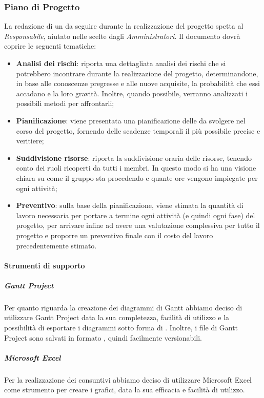 \subsubsection{Piano di Progetto}
La redazione di un  da seguire durante la realizzazione del progetto spetta al \emph{Responsabile}, aiutato nelle scelte dagli \emph{Amministratori}. Il documento dovrà coprire le seguenti tematiche:
 \begin{itemize}
 	\item\textbf{{Analisi dei rischi}}: riporta una dettagliata analisi dei rischi che si potrebbero incontrare durante la realizzazione del progetto, determinandone, in base alle conoscenze pregresse e alle nuove acquisite, la probabilità che essi accadano e la loro gravità. Inoltre, quando possibile, verranno analizzati i possibili metodi per affrontarli;
 	\item\textbf{{Pianificazione}}: viene presentata una pianificazione delle  da svolgere nel corso del progetto, fornendo delle scadenze temporali il più possibile precise e veritiere;
 	\item {\textbf{Suddivisione risorse}: riporta la suddivisione oraria delle risorse, tenendo conto dei ruoli ricoperti da tutti i membri. In questo modo si ha una visione chiara su come il gruppo sta procedendo e quante ore vengono impiegate per ogni attività;}
 	\item\textbf{{Preventivo}}: sulla base della pianificazione, viene stimata la quantità di lavoro necessaria per portare a termine ogni attività (e quindi ogni fase) del progetto, per arrivare infine ad avere una valutazione complessiva per tutto il progetto e proporre un preventivo finale con il costo del lavoro precedentemente stimato.
 \end{itemize}
\paragraph{Strumenti di supporto}
\subparagraph{Gantt Project}\Spazio
Per quanto riguarda la creazione dei diagrammi di Gantt abbiamo deciso di utilizzare Gantt Project data la sua completezza, facilità di utilizzo e la possibilità di esportare i diagrammi sotto forma di . Inoltre, i file di Gantt Project sono salvati in formato , quindi facilmente versionabili.
\subparagraph{Microsoft Excel}\Spazio
Per la realizzazione dei consuntivi abbiamo deciso di utilizzare Microsoft Excel come strumento per creare i grafici, data la sua efficacia e facilità di utilizzo.

